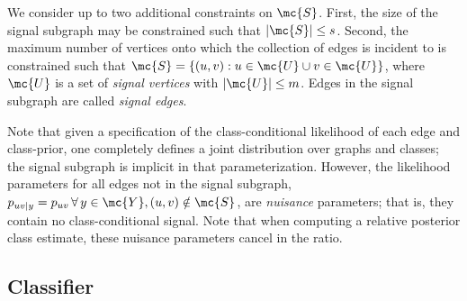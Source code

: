 \documentclass[10pt,journal,cspaper,compsoc]{IEEEtran}
\begin{document}
We consider up to two additional constraints on $\mc{S}$.  First, the size of the signal subgraph may be constrained such that $|\mc{S}| \leq s$. Second, the maximum number of vertices onto which the collection of edges is incident to is constrained such that $\mc{S}=\{(u,v): u \in \mc{U} \cup v \in \mc{U}\}$, where $\mc{U}$ is a set of \emph{signal vertices} with $|\mc{U}|\leq m$. Edges in the signal subgraph are called \emph{signal edges}. 

Note that given a specification of the class-conditional likelihood of each edge and class-prior, one completely defines a joint distribution over graphs and classes; the signal subgraph is implicit in that parameterization. However, the likelihood parameters for all edges not in the signal subgraph, $p_{uv|y}=p_{uv} \, \forall \, y \in \mc{Y}, (u,v) \notin \mc{S}$,  are \emph{nuisance} parameters; that is, they contain no class-conditional signal.  Note that when computing a relative posterior class estimate, these nuisance parameters cancel in the ratio.




\subsection{Classifier} %
\label{sub:classifier}
\end{document}
